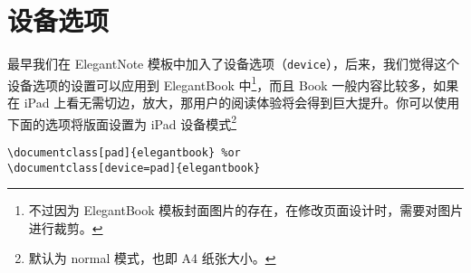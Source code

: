 \section{设备选项}
最早我们在 ElegantNote 模板中加入了设备选项（\lstinline{device}），后来，我们觉得这个设备选项的设置可以应用到 ElegantBook 中\footnote{不过因为 ElegantBook 模板封面图片的存在，在修改页面设计时，需要对图片进行裁剪。}，而且 Book 一般内容比较多，如果在 iPad 上看无需切边，放大，那用户的阅读体验将会得到巨大提升。你可以使用下面的选项将版面设置为 iPad 设备模式\footnote{默认为 normal 模式，也即 A4 纸张大小。}
\begin{lstlisting}
\documentclass[pad]{elegantbook} %or
\documentclass[device=pad]{elegantbook}
\end{lstlisting}